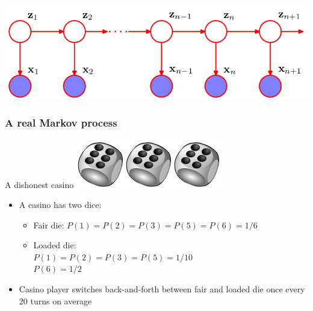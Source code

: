 \documentclass[usenames,dvipsnames]{beamer}
\begin{document}
\begin{frame}
  \begin{center}
    \includegraphics[scale=0.4]{hmm-chain.png}
  \end{center}
\end{frame}



\begin{frame}
  \frametitle{A real Markov process}
A dishonest casino
\hskip 2cm \includegraphics{dice.png}\includegraphics{dice.png}\includegraphics{dice.png}
  \begin{itemize}
  \item A casino has two dice:
    \begin{itemize}
    \item Fair die:     $P(1) = P(2) = P(3) = P(5) = P(6) = 1/6$
    \item Loaded die: \\
      $P(1) = P(2) = P(3) = P(5) = 1/10$\\
      $P(6) = 1/2$
    \end{itemize}
  \item Casino player switches back-and-forth between fair and loaded
    die once every 20 turns on average
  \end{itemize}
\end{frame}
\end{document}
